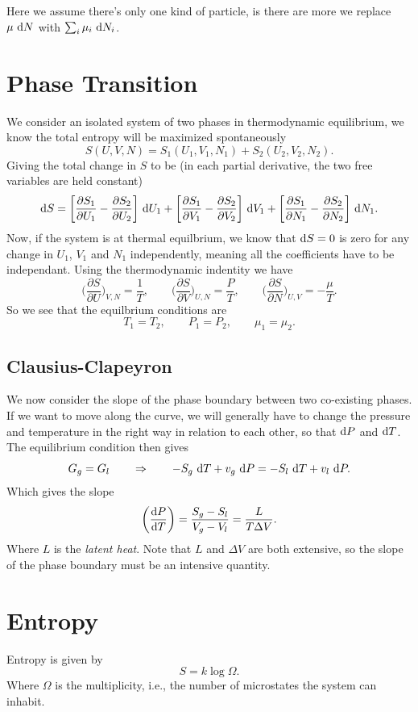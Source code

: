 \documentclass[a4paper, 11pt, notitlepage, english]{article}
\renewcommand{\d}{{\rm d}}
\newcommand{\To}{\quad\Rightarrow\quad}
\newcommand{\p}{\partial}
\begin{document}
Here we assume there's only one kind of particle, is there are more we replace $\mu \ \d N$ with $\sum_i \mu_i \ \d N_i$.

\clearpage

\section{Phase Transition}

We consider an isolated system of two phases in thermodynamic equilibrium, we know the total entropy will be maximized spontaneously
$$S(U,V,N) = S_1(U_1,V_1,N_1) + S_2(U_2,V_2,N_2).$$
Giving the total change in $S$ to be (in each partial derivative, the two free variables are held constant)
$$\d S = \bigg[\frac{\p S_1}{\p U_1} - \frac{\p S_2}{\p U_2}\bigg]\ \d U_1 + \bigg[\frac{\p S_1}{\p V_1} - \frac{\p S_2}{\p V_2}\bigg]\ \d V_1 + \bigg[\frac{\p S_1}{\p N_1} - \frac{\p S_2}{\p N_2}\bigg]\ \d N_1.$$
Now, if the system is at thermal equilbrium, we know that $\d S = 0$ is zero for any change in $U_1$, $V_1$ and $N_1$ independently, meaning all the coefficients have to be independant. Using the thermodynamic indentity we have
$$\bigg(\frac{\p S}{\p U}\bigg)_{V, N} = \frac{1}{T}, \qquad \bigg(\frac{\p S}{\p V}\bigg)_{U, N} = \frac{P}{T}, \qquad \bigg(\frac{\p S}{\p N}\bigg)_{U, V} = -\frac{\mu}{T}.$$
So we see that the equilbrium conditions are
$$T_1 = T_2, \qquad P_1 = P_2, \qquad \mu_1 = \mu_2.$$

\subsection*{Clausius-Clapeyron}
We now consider the slope of the phase boundary between two co-existing phases. If we want to move along the curve, we will generally have to change the pressure and temperature in the right way in relation to each other, so that $\d P$ and $\d T$. The equilibrium condition then gives
$$G_g = G_l \quad \To \quad -S_g \ \d T + v_g \ \d P = - S_l \ \d T + v_l \ \d P.$$
Which gives the slope
$$\bigg(\frac{\d P}{\d T}\bigg) = \frac{S_g - S_l}{V_g - V_l} = \frac{L}{T\Delta V}.$$
Where $L$ is the \emph{latent heat}. Note that $L$ and $\Delta V$ are both extensive, so the slope of the phase boundary must be an intensive quantity.

\section*{Entropy}
Entropy is given by
$$S = k \log \Omega.$$
Where $\Omega$ is the multiplicity, i.e., the number of microstates the system can inhabit.
\end{document}
